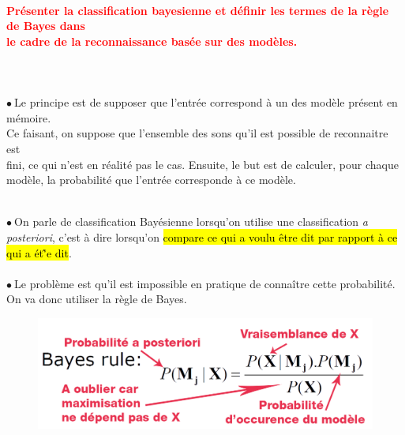 \documentclass[letterpaper, 12pt]{article}
\newcommand{\alinea}{
\hspace*{0.3cm}}
\newcommand{\red}[1]{
	\textcolor{red}{#1}
}
\newcommand{\point}{$\bullet\ $}
\begin{document}
		\paragraph{\red{Présenter la classification bayesienne et définir les termes de la règle de Bayes dans 
		~\\ \hspace*{0.035cm} le cadre de la reconnaissance basée sur des modèles.}}~\\~\\
			\point Le principe est de supposer que l'entrée correspond à un des modèle présent en mémoire.
				\\\alinea Ce faisant, on suppose que l'ensemble des sons qu'il est possible de reconnaitre est
				\\\alinea fini, ce qui n'est en réalité pas le cas. Ensuite, le but est de calculer, pour chaque
				\\\alinea modèle, la probabilité que l'entrée corresponde à ce modèle.\\~\\
			\begin{minipage}{0.4\textwidth}
				\point On parle de classification Bayésienne lorsqu'on utilise une classification \textit{a posteriori},
					c'est à dire lorsqu'on \hl{compare ce qui a voulu \^etre dit par rapport 
					\`a ce qui a \'et\^'e dit}.\\~\\
				\point Le problème est qu'il est impossible en pratique de connaître cette probabilité. On va donc
					utiliser la règle de Bayes.
			\end{minipage}\hfill
			\begin{minipage}{0.55\textwidth}
				\begin{figure}[H]
					\centering
					\includegraphics[scale=0.4]{Images/bayes}
				\end{figure}\noindent
			\end{minipage}
\end{document}
